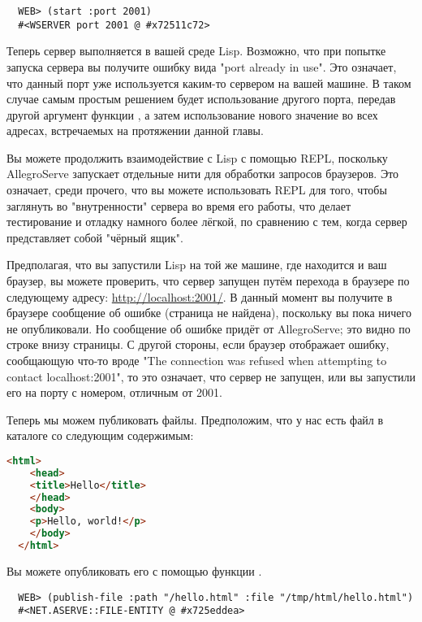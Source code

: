 \begin{lstlisting}
  WEB> (start :port 2001)
  #<WSERVER port 2001 @ #x72511c72>
\end{lstlisting}

Теперь сервер выполняется в вашей среде Lisp. Возможно, что при попытке запуска сервера вы
получите ошибку вида "port already in use". Это означает, что данный порт уже используется
каким-то сервером на вашей машине. В таком случае самым простым решением будет
использование другого порта, передав другой аргумент функции , а затем
использование нового значение во всех адресах, встречаемых на протяжении данной главы.

Вы можете продолжить взаимодействие с Lisp с помощью REPL, поскольку AllegroServe
запускает отдельные нити для обработки запросов браузеров. Это означает, среди прочего,
что вы можете использовать REPL для того, чтобы заглянуть во "внутренности" сервера во
время его работы, что делает тестирование и отладку намного более лёгкой, по сравнению с
тем, когда сервер представляет собой "чёрный ящик".

Предполагая, что вы запустили Lisp на той же машине, где находится и ваш браузер, вы
можете проверить, что сервер запущен путём перехода в браузере по следующему адресу:
\url{http://localhost:2001/}. В данный момент вы получите в браузере сообщение об ошибке
 (страница не найдена), поскольку вы пока ничего не опубликовали. Но
сообщение об ошибке придёт от AllegroServe; это видно по строке внизу страницы. С другой
стороны, если браузер отображает ошибку, сообщающую что-то вроде "The connection was
refused when attempting to contact localhost:2001", то это означает, что сервер не
запущен, или вы запустили его на порту с номером, отличным от 2001.

Теперь мы можем публиковать файлы. Предположим, что у нас есть файл  в
каталоге  со следующим содержимым:

\begin{lstlisting}[language=HTML]
  <html>
    <head>
    <title>Hello</title>
    </head>
    <body>
    <p>Hello, world!</p>
    </body>
  </html>
\end{lstlisting}

Вы можете опубликовать его с помощью функции .

\begin{lstlisting}
  WEB> (publish-file :path "/hello.html" :file "/tmp/html/hello.html")
  #<NET.ASERVE::FILE-ENTITY @ #x725eddea>
\end{lstlisting}

